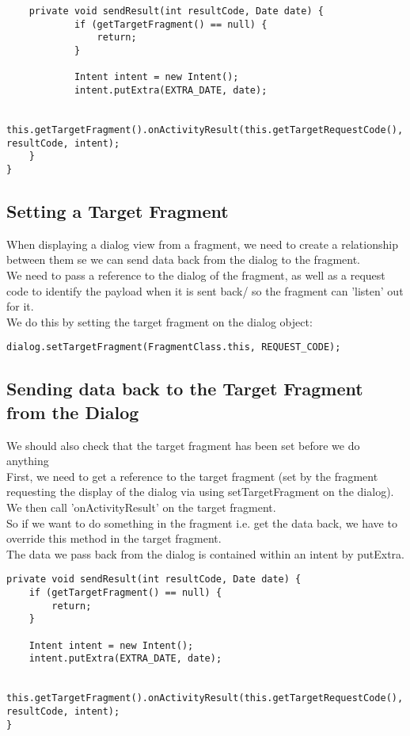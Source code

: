 \documentclass[]{article}
\begin{document}
\begin{lstlisting}
	private void sendResult(int resultCode, Date date) {
			if (getTargetFragment() == null) {
				return;
			}

			Intent intent = new Intent();
			intent.putExtra(EXTRA_DATE, date);

			this.getTargetFragment().onActivityResult(this.getTargetRequestCode(), resultCode, intent);
	}
}

\end{lstlisting}

\subsection{Setting a Target Fragment}
When displaying a dialog view from a fragment, we need to create a relationship between them se we can send data back from the dialog to the fragment.  
\\
We need to pass a reference to the dialog of the fragment, as well as a request code to identify the payload when it is sent back/ so the fragment can 'listen' out for it.
\\
We do this by setting the target fragment on the dialog object:
\begin{lstlisting}
dialog.setTargetFragment(FragmentClass.this, REQUEST_CODE);
\end{lstlisting}

\subsection{Sending data back to the Target Fragment from the Dialog}
We should also check that the target fragment has been set before we do anything
\\
First, we need to get a reference to the target fragment (set by the fragment requesting the display of the dialog via using setTargetFragment on the dialog).
\\
We then call 'onActivityResult' on the target fragment.
\\
So if we want to do something in the fragment i.e. get the data back, we have to override this method in the target fragment.
\\
The data we pass back from the dialog is contained within an intent by putExtra.
\begin{lstlisting}
private void sendResult(int resultCode, Date date) {
	if (getTargetFragment() == null) {
		return;
	}

	Intent intent = new Intent();
	intent.putExtra(EXTRA_DATE, date);

	this.getTargetFragment().onActivityResult(this.getTargetRequestCode(), resultCode, intent);
}
\end{lstlisting}
\end{document}

